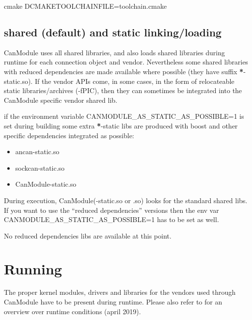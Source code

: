 \documentclass[letterpaper,10pt,english]{sphinxmanual}
\begin{document}
\begin{sphinxVerbatim}[commandchars=\\\{\}]
cmake \PYGZhy{}DCMAKE\PYGZus{}TOOLCHAIN\PYGZus{}FILE=toolchain.cmake
\end{sphinxVerbatim}


\section{shared (default) and static linking/loading}
\label{\detokenize{building:shared-default-and-static-linking-loading}}
CanModule uses all shared libraries, and also loads shared libraries during runtime for each connection
object and vendor. Nevertheless some shared libraries with reduced dependencies are made available
where possible (they have suffix {\color{red}\bfseries{}*}-static.so).
If the vendor APIs come, in some cases, in the form of relocateable static libraries/archives (-fPIC), then they
can sometimes be integrated into the CanModule specific vendor shared lib.

if the environment variable CANMODULE\_AS\_STATIC\_AS\_POSSIBLE=1 is set during building some extra {\color{red}\bfseries{}*}-static
libs are produced with boost and other specific dependencies integrated as possible:
\begin{itemize}
\item {} 
ancan-static.so

\item {} 
sockcan-static.so

\item {} 
CanModule-static.so

\end{itemize}

During execution, CanModule(-static.so or .so) looks for the standard shared libs.
If you want to use the “reduced dependencies” versions then the env var CANMODULE\_AS\_STATIC\_AS\_POSSIBLE=1
has to be set  as well.


No reduced dependencies libs are available at this point.


\chapter{Running}
\label{\detokenize{running:running}}\label{\detokenize{running::doc}}
The proper kernel modules, drivers and libraries for the vendors used through CanModule
have to be present during runtime. Please also refer to  for an overview over
runtime conditions (april 2019).
\end{document}
